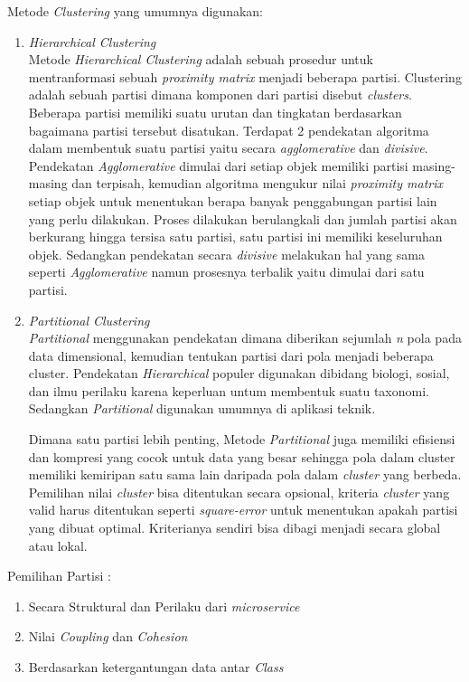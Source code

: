 Metode \textit{Clustering} yang umumnya digunakan:
\begin{enumerate}[leftmargin=1.3cm]
	\item \textit{Hierarchical Clustering} \\
	Metode \textit{Hierarchical Clustering} adalah sebuah prosedur untuk mentranformasi sebuah \textit{proximity matrix} menjadi beberapa partisi. Clustering adalah sebuah partisi dimana komponen dari partisi disebut \textit{clusters}. Beberapa partisi memiliki suatu urutan dan tingkatan berdasarkan bagaimana partisi tersebut disatukan. Terdapat 2 pendekatan algoritma dalam membentuk suatu partisi yaitu secara \textit{agglomerative} dan \textit{divisive}. 
	Pendekatan \textit{Agglomerative} dimulai dari setiap objek memiliki partisi masing-masing dan terpisah, kemudian algoritma mengukur nilai \textit{proximity matrix} setiap objek untuk menentukan berapa banyak penggabungan partisi lain yang perlu dilakukan. Proses dilakukan berulangkali dan jumlah partisi akan berkurang hingga tersisa satu partisi, satu partisi ini memiliki keseluruhan objek. Sedangkan pendekatan secara \textit{divisive} melakukan hal yang sama seperti \textit{Agglomerative} namun prosesnya terbalik yaitu dimulai dari satu partisi.
	\item \textit{Partitional Clustering} \\
	\textit{Partitional} menggunakan pendekatan dimana diberikan sejumlah \textit{n} pola pada data dimensional, kemudian tentukan partisi dari pola menjadi beberapa cluster. Pendekatan \textit{Hierarchical} populer digunakan dibidang biologi, sosial, dan ilmu perilaku karena keperluan untum membentuk suatu taxonomi. Sedangkan \textit{Partitional} digunakan umumnya di aplikasi teknik. 
	
	Dimana satu partisi lebih penting, Metode \textit{Partitional} juga memiliki efisiensi dan kompresi yang cocok untuk data yang besar sehingga pola dalam cluster memiliki kemiripan satu sama lain daripada pola dalam \textit{cluster} yang berbeda. Pemilihan nilai \textit{cluster} bisa ditentukan secara opsional, kriteria \textit{cluster} yang valid harus ditentukan seperti \textit{square-error} untuk menentukan apakah partisi yang dibuat optimal. Kriterianya sendiri bisa dibagi menjadi secara global atau lokal.  

\end{enumerate}	
Pemilihan Partisi :	
\begin{enumerate}[leftmargin=1.3cm]
	\item Secara Struktural dan Perilaku dari \textit{microservice}
	\item Nilai \textit{Coupling} dan \textit{Cohesion}
	\item Berdasarkan ketergantungan data antar \textit{Class}
\end{enumerate}	

